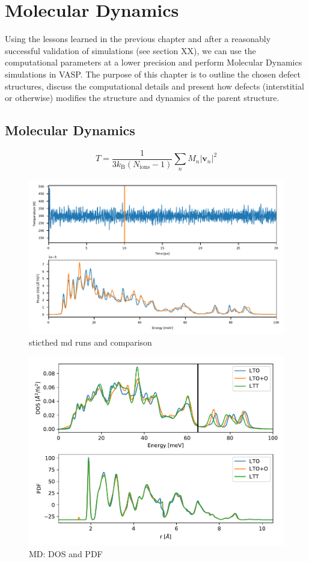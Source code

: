 \chapter{Molecular Dynamics}\label{ch:md}

Using the lessons learned in the previous chapter and after a reasonably successful validation of simulations (see section XX), we can use the computational parameters at a lower precision and perform Molecular Dynamics simulations in VASP. The purpose of this chapter is to outline the chosen defect structures, discuss the computational details and present how defects (interstitial or otherwise) modifies the structure and dynamics of the parent structure.


\section{Molecular Dynamics}
\[ T = \frac{1}{3 k_\text{B} (N_\text{ions}-1)} \sum_n M_n |\bm{v}_n|^2 \]

\begin{figure}
	\centering
	\includegraphics[width=\textwidth]{fig/md/stitch.pdf}
	\caption[stitched md runs]{sticthed md runs and comparison}
	\label{fig:stitch}
\end{figure}

\begin{figure}
	\centering
	\includegraphics[width=\textwidth]{fig/md/lto_ltt_ltoo_comparison.pdf}
	\caption[MD: DOS and PDF]{MD: DOS and PDF}
	\label{fig:dos_pdf}
\end{figure}

